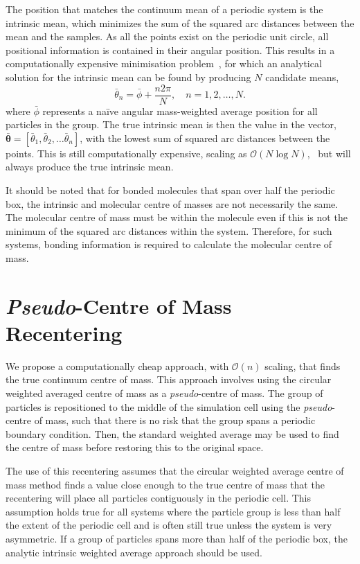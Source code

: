 \documentclass[reprint,superscriptaddress,nobibnotes,amsmath,amssymb,aip]{revtex4-2}
\begin{document}
The position that matches the continuum mean of a periodic system is the intrinsic mean, which minimizes the sum of the squared arc distances between the mean and the samples. 
As all the points exist on the periodic unit circle, all positional information is contained in their angular position. 
This results in a computationally expensive minimisation problem~\cite{hotz_extrinsic_2013}, for which an analytical solution for the intrinsic mean can be found by producing $N$ candidate means,
%
\begin{equation}
\bar{\theta}_{n} = \bar{\phi} + \frac{n 2\pi}{N}, \quad n = 1, 2, \dots, N.
\end{equation}
%
where $\bar{\phi}$ represents a naïve angular mass-weighted average position for all particles in the group.
The true intrinsic mean is then the value in the vector, $\bar{\bm{\theta}} = [\bar{\theta}_{1}, \bar{\theta}_{2}, \ldots \bar{\theta}_{n}]$, with the lowest sum of squared arc distances between the points. 
This is still computationally expensive, scaling as $\mathcal{O}(N\log N)$,~\cite{hotz_intrinsic_2011} but will always produce the true intrinsic mean.

It should be noted that for bonded molecules that span over half the periodic box, the intrinsic and molecular centre of masses are not necessarily the same.
The molecular centre of mass must be within the molecule even if this is not the minimum of the squared arc distances within the system.
Therefore, for such systems, bonding information is required to calculate the molecular centre of mass. 

\section{\emph{Pseudo}-Centre of Mass Recentering}

We propose a computationally cheap approach, with $\mathcal{O}(n)$ scaling, that finds the true continuum centre of mass. 
This approach involves using the circular weighted averaged centre of mass as a \emph{pseudo}-centre of mass. 
The group of particles is repositioned to the middle of the simulation cell using the \emph{pseudo}-centre of mass, such that there is no risk that the group spans a periodic boundary condition. 
Then, the standard weighted average may be used to find the centre of mass before restoring this to the original space. 

The use of this recentering assumes that the circular weighted average centre of mass method finds a value close enough to the true centre of mass that the recentering will place all particles contiguously in the periodic cell. 
This assumption holds true for all systems where the particle group is less than half the extent of the periodic cell and is often still true unless the system is very asymmetric. 
If a group of particles spans more than half of the periodic box, the analytic intrinsic weighted average approach should be used. 
\end{document}
